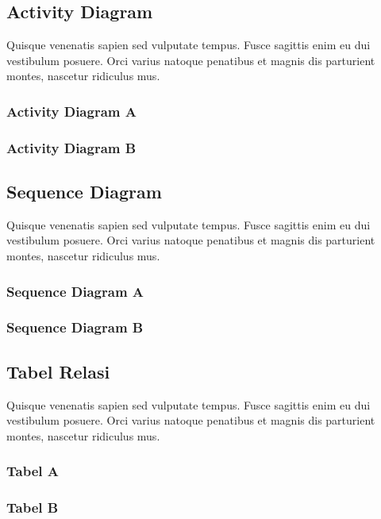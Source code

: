 \subsection{Activity Diagram}
Quisque venenatis sapien sed vulputate tempus. Fusce sagittis enim eu dui vestibulum posuere. Orci varius natoque penatibus et magnis dis parturient montes, nascetur ridiculus mus.
\subsubsection{Activity Diagram A}
\subsubsection{Activity Diagram B}

\subsection{Sequence Diagram}
Quisque venenatis sapien sed vulputate tempus. Fusce sagittis enim eu dui vestibulum posuere. Orci varius natoque penatibus et magnis dis parturient montes, nascetur ridiculus mus.
\subsubsection{Sequence Diagram A}
\subsubsection{Sequence Diagram B}

\subsection{Tabel Relasi}
Quisque venenatis sapien sed vulputate tempus. Fusce sagittis enim eu dui vestibulum posuere. Orci varius natoque penatibus et magnis dis parturient montes, nascetur ridiculus mus.
\subsubsection{Tabel A}
\subsubsection{Tabel B}